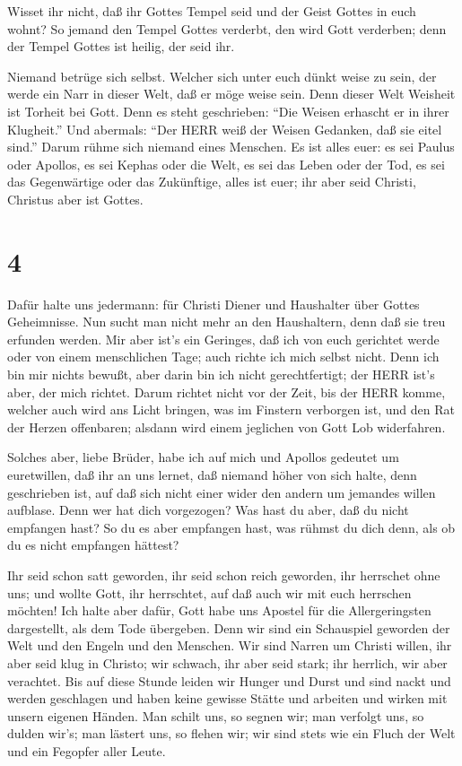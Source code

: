  Wisset ihr nicht, daß ihr Gottes Tempel seid und der Geist
Gottes in euch wohnt?  So jemand den Tempel Gottes
verderbt, den wird Gott verderben; denn der Tempel Gottes ist heilig,
der seid ihr.

 Niemand betrüge sich selbst. Welcher sich unter euch dünkt
weise zu sein, der werde ein Narr in dieser Welt, daß er möge weise
sein.  Denn dieser Welt Weisheit ist Torheit bei Gott. Denn
es steht geschrieben: ``Die Weisen erhascht er in ihrer Klugheit.''
 Und abermals: ``Der HERR weiß der Weisen Gedanken, daß sie
eitel sind.''  Darum rühme sich niemand eines Menschen. Es
ist alles euer:  es sei Paulus oder Apollos, es sei Kephas
oder die Welt, es sei das Leben oder der Tod, es sei das Gegenwärtige
oder das Zukünftige, alles ist euer;  ihr aber seid
Christi, Christus aber ist Gottes.

\hypertarget{section-3}{%
\section{4}\label{section-3}}

 Dafür halte uns jedermann: für Christi Diener und
Haushalter über Gottes Geheimnisse.  Nun sucht man nicht
mehr an den Haushaltern, denn daß sie treu erfunden werden. 
Mir aber ist's ein Geringes, daß ich von euch gerichtet werde oder von
einem menschlichen Tage; auch richte ich mich selbst nicht. 
Denn ich bin mir nichts bewußt, aber darin bin ich nicht gerechtfertigt;
der HERR ist's aber, der mich richtet.  Darum richtet nicht
vor der Zeit, bis der HERR komme, welcher auch wird ans Licht bringen,
was im Finstern verborgen ist, und den Rat der Herzen offenbaren;
alsdann wird einem jeglichen von Gott Lob widerfahren.

 Solches aber, liebe Brüder, habe ich auf mich und Apollos
gedeutet um euretwillen, daß ihr an uns lernet, daß niemand höher von
sich halte, denn geschrieben ist, auf daß sich nicht einer wider den
andern um jemandes willen aufblase.  Denn wer hat dich
vorgezogen? Was hast du aber, daß du nicht empfangen hast? So du es aber
empfangen hast, was rühmst du dich denn, als ob du es nicht empfangen
hättest?

 Ihr seid schon satt geworden, ihr seid schon reich
geworden, ihr herrschet ohne uns; und wollte Gott, ihr herrschtet, auf
daß auch wir mit euch herrschen möchten!  Ich halte aber
dafür, Gott habe uns Apostel für die Allergeringsten dargestellt, als
dem Tode übergeben. Denn wir sind ein Schauspiel geworden der Welt und
den Engeln und den Menschen.  Wir sind Narren um Christi
willen, ihr aber seid klug in Christo; wir schwach, ihr aber seid stark;
ihr herrlich, wir aber verachtet.  Bis auf diese Stunde
leiden wir Hunger und Durst und sind nackt und werden geschlagen und
haben keine gewisse Stätte  und arbeiten und wirken mit
unsern eigenen Händen. Man schilt uns, so segnen wir; man verfolgt uns,
so dulden wir's; man lästert uns, so flehen wir;  wir sind
stets wie ein Fluch der Welt und ein Fegopfer aller Leute.

